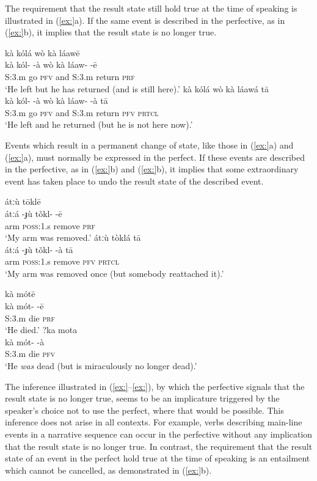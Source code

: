 The requirement that the result state still hold true at the time of speaking is illustrated in (\ref{ex:}a). If the same event is described in the perfective, as in (\ref{ex:}b), it implies that the result state is no longer true.


\ea
\ea  \glll kà  kólá    wò  kà  láawē\\
kà  kól-  -à  wò  kà  láaw-  -ē\\
S:3.m  go  \textsc{pfv}  and  S:3.m  return  \textsc{prf}\\
\glt ‘He left but he has returned (and is still here).’
\ex \glll   kà  kólá    wò  kà  láawá    tā\\
kà  kól-  -à  wò  kà  láaw-  -à  tā\\
S:3.m  go  \textsc{pfv}  and  S:3.m  return  \textsc{pfv}  \textsc{prtcl}\\
\glt ‘He left and he returned (but he is not here now).’
\z \z


Events which result in a permanent change of state, like those in (\ref{ex:}a) and (\ref{ex:}a), must normally be expressed in the perfect. If these events are described in the perfective, as in (\ref{ex:}b) and (\ref{ex:}b), it implies that some extraordinary event has taken place to undo the result state of the described event.


\ea
\ea  \glll átːù    tōklē\\
átːá  -ɟù  tǒkl-  -ē\\
arm  \textsc{poss}:1.s  remove  \textsc{prf}\\
\glt ‘My arm was removed.’
\ex \glll  átːù    tòklá    tā\\
átːá  -ɟù  tǒkl-  -à  tā\\
arm  \textsc{poss}:1.s  remove  \textsc{pfv}  \textsc{prtcl}\\
\glt ‘My arm was removed once (but somebody reattached it).’
\z \z

\ea
\ea  \glll kà  mótē\\
kà  mót-  -ē\\
S:3.m  die  \textsc{prf}\\
\glt ‘He died.’
\ex \glll ?ka  mota\\
 kà  mót-  -à\\
S:3.m  die  \textsc{pfv}\\
\glt ‘He \textit{was} dead (but is miraculously no longer dead).’
\z \z


The inference illustrated in (\ref{ex:}--\ref{ex:}), by which the perfective signals that the result state is no longer true, seems to be an implicature triggered by the speaker’s choice not to use the perfect, where that would be possible. This inference does not arise in all contexts. For example, verbs describing main-line events in a narrative sequence can occur in the perfective without any implication that the result state is no longer true. In contrast, the requirement that the result state of an event in the perfect hold true at the time of speaking is an entailment which cannot be cancelled, as demonstrated in (\ref{ex:}b).


